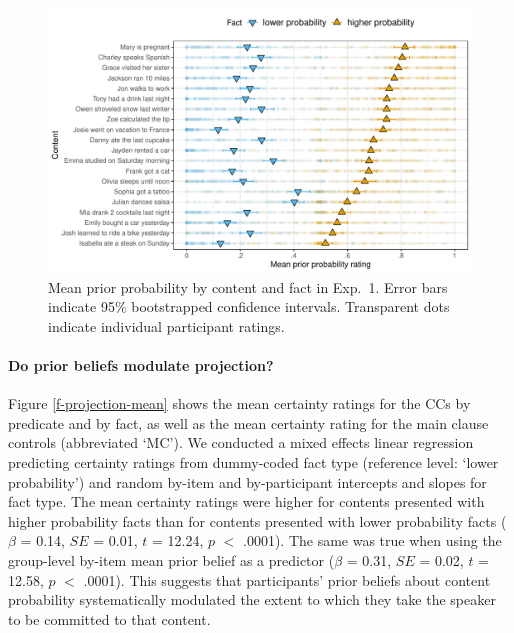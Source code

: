 \documentclass[OpenMind]{stjour}
\begin{document}
\begin{figure}[h!]
\centering
\includegraphics[width=\textwidth]{../../results/9-prior-projection/graphs/prior-ratings}

\caption{Mean prior probability by content and fact in Exp.~1. Error bars indicate 95\% bootstrapped confidence intervals. Transparent dots indicate individual participant ratings.} 
\label{f-prior}
\end{figure}

\paragraph{Do prior beliefs modulate projection?}  Figure \ref{f-projection-mean} shows the mean certainty ratings for the CCs by  predicate and by fact, as well as the mean certainty rating for the main clause controls (abbreviated `MC'). We conducted a mixed effects linear regression predicting certainty ratings from dummy-coded fact type (reference level: `lower probability') and random by-item and by-participant intercepts and slopes for fact type. The mean certainty ratings were higher for contents  presented with higher probability facts than for contents presented with lower probability facts ($\beta$ = 0.14, $SE$ = 0.01, $t$ = 12.24, $p$ $<$ .0001).   The same was true when using the group-level by-item mean prior belief as a predictor  ($\beta$ = 0.31, $SE$ = 0.02, $t$ = 12.58, $p$ $<$ .0001).   This suggests that participants' prior beliefs about content probability systematically modulated the extent to which they take the speaker to be committed to that content.
\end{document}
